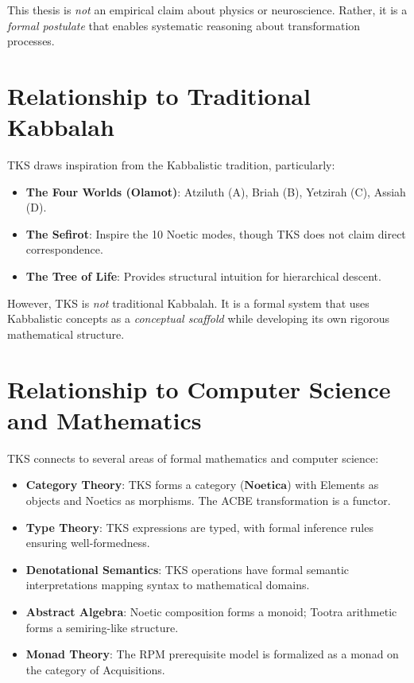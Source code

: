 \documentclass[11pt,twoside,openright]{book}
\theoremstyle{definition}
\theoremstyle{plain}
\theoremstyle{remark}
\newcommand{\Noetica}{\mathbf{Noetica}}
\begin{document}
This thesis is \emph{not} an empirical claim about physics or neuroscience. Rather, it is a \emph{formal postulate} that enables systematic reasoning about transformation processes.

\section{Relationship to Traditional Kabbalah}

TKS draws inspiration from the Kabbalistic tradition, particularly:

\begin{itemize}
  \item \textbf{The Four Worlds (Olamot)}: Atziluth (A), Briah (B), Yetzirah (C), Assiah (D).
  \item \textbf{The Sefirot}: Inspire the 10 Noetic modes, though TKS does not claim direct correspondence.
  \item \textbf{The Tree of Life}: Provides structural intuition for hierarchical descent.
\end{itemize}

However, TKS is \emph{not} traditional Kabbalah. It is a formal system that uses Kabbalistic concepts as a \emph{conceptual scaffold} while developing its own rigorous mathematical structure.

\section{Relationship to Computer Science and Mathematics}

TKS connects to several areas of formal mathematics and computer science:

\begin{itemize}
  \item \textbf{Category Theory}: TKS forms a category ($\Noetica$) with Elements as objects and Noetics as morphisms. The ACBE transformation is a functor.
  \item \textbf{Type Theory}: TKS expressions are typed, with formal inference rules ensuring well-formedness.
  \item \textbf{Denotational Semantics}: TKS operations have formal semantic interpretations mapping syntax to mathematical domains.
  \item \textbf{Abstract Algebra}: Noetic composition forms a monoid; Tootra arithmetic forms a semiring-like structure.
  \item \textbf{Monad Theory}: The RPM prerequisite model is formalized as a monad on the category of Acquisitions.
\end{itemize}
\end{document}
